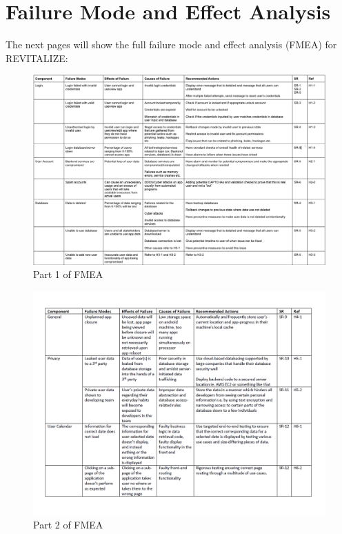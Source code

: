 \documentclass{article}
\begin{document}
\section{Failure Mode and Effect Analysis}
The next pages will show the full failure mode and effect analysis (FMEA) for REVITALIZE:
\begin{landscape}
	\begin{figure}[ht]
		\centering
		\includegraphics[angle=360, scale=1.42]{FMEAPart1.png}
		\caption{Part 1 of FMEA}
	\end{figure}
\end{landscape}

\begin{landscape}
	\begin{figure}[ht]
		\centering
		\includegraphics[angle=360, scale=0.72]{FMEA_part_2.png}
		\caption{Part 2 of FMEA}
	\end{figure}
\end{landscape}
\end{document}
